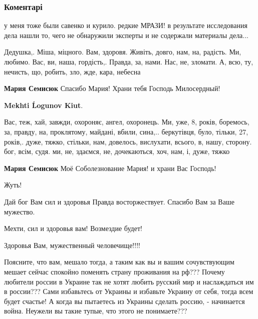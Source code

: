  
 
 
 
 
\subsubsection{Коментарі}

\begin{itemize} %

у меня тоже были савенко и курило. редкие МРАЗИ! в результате исследования дела
нашли то, чего не обнаружили эксперты и не содержали материалы дела...


Дедушка,. Міша, міцного. Вам, здоровя. Живіть, довго, нам, на, радість. Ми,
любимо. Вас, ви, наша, гордість,. Правда, за, нами. Нас, не, зломати. А, всю,
ту, нечисть, що, робить, зло, жде, кара, небесна

\begin{itemize} %
\textbf{Мария Семисюк} Спасибо Мария! Храни тебя Господь Милосердный!

\textbf{Mekhti Ĺogunov Kiut}. 

Вас, теж, хай, завжди, охороняє, ангел, охоронець. Ми, уже, 8, років, боремось,
за, правду, на, проклятому, майдані, вбили, сина,.. беркутівця, було, тільки,
27, років,. дуже, тяжко, стільки, нам, довелось, вислухати, всього, в, нашу,
сторону. бог, всім, судя. ми, не, здаємся, не, дочекаються, хоч, нам, і, дуже,
тяжко

\textbf{Мария Семисюк} Моё Соболезнование Мария! и храни Вас Господь!
\end{itemize} %

Жуть!

Дай бог Вам сил и здоровья
Правда восторжествует. Спасибо Вам за Ваше мужество.

Мехти, сил и здоровья вам! Возмездие будет!

Здоровья Вам, мужественный человечище!!!!


Поясните, что вам, мешало тогда, а таким как вы и вашим сочувствующим мешает
сейчас спокойно поменять страну проживания на рф??? Почему любители россии в
Украине так не хотят любить русский мир и наслаждаться им в россии??? Сами
избавьтесь от Украины и избавьте Украину от себя, тогда всем будет счастье! А
когда вы пытаетесь из Украины сделать россию, - начинается война. Неужели вы
такие тупые, что этого не понимаете???


\end{itemize}

